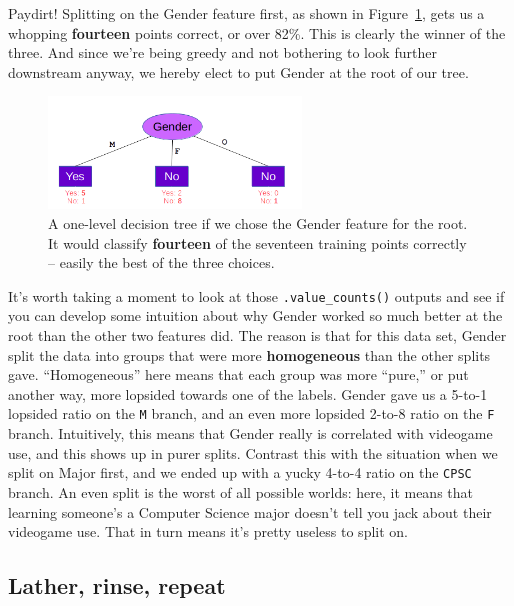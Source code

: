 Paydirt! Splitting on the \textsf{Gender} feature first, as shown in
Figure~\ref{fig:genderOnTop}, gets us a whopping \textbf{fourteen} points
correct, or over 82\%. This is clearly the winner of the three. And since we're
being greedy and not bothering to look further downstream anyway, we hereby
elect to put \textsf{Gender} at the root of our tree.

\begin{figure}[ht]
\centering
\includegraphics[width=0.6\textwidth]{genderOnTop.png}
\caption{A one-level decision tree if we chose the \textsf{Gender} feature for
the root. It would classify \textbf{fourteen} of the seventeen training points
correctly -- easily the best of the three choices.}
\label{fig:genderOnTop}
\end{figure}

It's worth taking a moment to look at those \texttt{.value\_counts()} outputs
and see if you can develop some intuition about why \textsf{Gender} worked so
much better at the root than the other two features did. The reason is that for
this data set, \textsf{Gender} split the data into groups that were more
\textbf{homogeneous} than the other splits gave. ``Homogeneous'' here means
that each group was more ``pure,'' or put another way, more lopsided towards
one of the labels. \textsf{Gender} gave us a 5-to-1 lopsided ratio on the
\texttt{M} branch, and an even more lopsided 2-to-8 ratio on the \texttt{F}
branch. Intuitively, this means that \textsf{Gender} really is correlated with
videogame use, and this shows up in purer splits. Contrast this with the
situation when we split on \textsf{Major} first, and we ended up with a yucky
4-to-4 ratio on the \texttt{CPSC} branch. An even split is the worst of all
possible worlds: here, it means that learning someone's a Computer Science
major doesn't tell you jack about their videogame use. That in turn means it's
pretty useless to split on.

\subsection{Lather, rinse, repeat}

